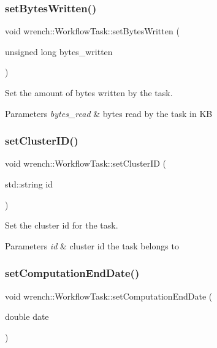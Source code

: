 \subsubsection{\texorpdfstring{set\+Bytes\+Written()}{setBytesWritten()}}
{\footnotesize\ttfamily void wrench\+::\+Workflow\+Task\+::set\+Bytes\+Written (\begin{DoxyParamCaption}\item[{unsigned long}]{bytes\+\_\+written }\end{DoxyParamCaption})}



Set the amount of bytes written by the task. 


\begin{DoxyParams}{Parameters}
{\em bytes\+\_\+read} & bytes read by the task in KB \\
\hline
\end{DoxyParams}
\mbox{\label{classwrench_1_1_workflow_task_ab8d621c9cf50b489fd6b092bea59872a}} 
\subsubsection{\texorpdfstring{set\+Cluster\+I\+D()}{setClusterID()}}
{\footnotesize\ttfamily void wrench\+::\+Workflow\+Task\+::set\+Cluster\+ID (\begin{DoxyParamCaption}\item[{std\+::string}]{id }\end{DoxyParamCaption})}



Set the cluster id for the task. 


\begin{DoxyParams}{Parameters}
{\em id} & cluster id the task belongs to \\
\hline
\end{DoxyParams}
\mbox{\label{classwrench_1_1_workflow_task_a573befd39e3efcc2a8979e81c4b106b9}} 
\subsubsection{\texorpdfstring{set\+Computation\+End\+Date()}{setComputationEndDate()}}
{\footnotesize\ttfamily void wrench\+::\+Workflow\+Task\+::set\+Computation\+End\+Date (\begin{DoxyParamCaption}\item[{double}]{date }\end{DoxyParamCaption})}



